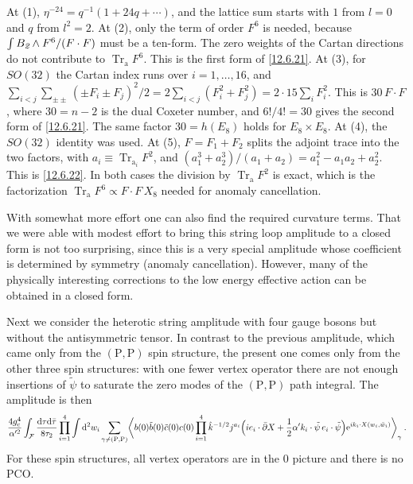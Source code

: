 \begin{tcolorbox}[breakable]
\begin{remark}
		At (1), $\eta^{-24}=q^{-1}(1+24q+\cdots)$, and the lattice sum starts with $1$ from $l=0$ and $q$ from $l^{2}=2$. At (2), only the term of order $F^{6}$ is needed, because $\int B_{\textit 2}\wedge F^{6}/(F\cdot F)$ must be a ten-form. The zero weights of the Cartan directions do not contribute to $\operatorname{Tr}_{\mathrm a}F^{6}$. This is the first form of \eqref{12.6.21}. At (3), for $SO(32)$ the Cartan index runs over $i=1,\dots,16$, and $\sum_{i<j}\sum_{\pm\pm}(\pm F_{i}\pm F_{j})^{2}/2=2\sum_{i<j}(F_{i}^{2}+F_{j}^{2})=2\cdot15\sum_{i}F_{i}^{2}$. This is $30\,F\cdot F$, where $30=n-2$ is the dual Coxeter number, and $6!/4!=30$ gives the second form of \eqref{12.6.21}. The same factor $30=h(E_{8})$ holds for $E_{8}\times E_{8}$. At (4), the $SO(32)$ identity was used. At (5), $F=F_{1}+F_{2}$ splits the adjoint trace into the two factors, with $a_{i}\equiv\operatorname{Tr}_{\mathrm a_i}F^{2}$, and $(a_{1}^{3}+a_{2}^{3})/(a_{1}+a_{2})=a_{1}^{2}-a_{1}a_{2}+a_{2}^{2}$. This is \eqref{12.6.22}. In both cases the division by $\operatorname{Tr}_{\mathrm a}F^{2}$ is exact, which is the factorization $\operatorname{Tr}_{\mathrm a}F^{6}\propto F\cdot F\,X_{8}$ needed for anomaly cancellation.
	\end{remark}
\end{tcolorbox}

\noindent With somewhat more effort one can also find the required curvature terms. That we were able with modest effort to bring this string loop amplitude to a closed form is not too surprising, since this is a very special amplitude whose coefficient is determined by symmetry (anomaly cancellation). However, many of the physically interesting corrections to the low energy effective action can be obtained in a closed form.

Next we consider the heterotic string amplitude with four gauge bosons but without the antisymmetric tensor. In contrast to the previous amplitude, which came only from the $(\mathrm{P},\mathrm{P})$ spin structure, the present one comes only from the other three spin structures: with one fewer vertex operator there are not enough insertions of $\tilde{\psi}$ to saturate the zero modes of the $(\mathrm{P},\mathrm{P})$ path integral. The amplitude is then
\begin{equation}
	\frac{4g_{\mathrm{c}}^4}{\alpha'^2}\int_{\mathcal{F}}\frac{\mathrm{d}\tau\mathrm{d}\bar{\tau}}{8\tau_2}\prod_{i=1}^{4}\int\mathrm{d}^2 w_i \sum_{\gamma\neq(\mathrm{P},\mathrm{P})}\biggl\langle b(0)\tilde{b}(0)\tilde{c}(0)c(0)\prod_{i=1}^{4}\hat{k}^{-1/2}j^{a_i}\Bigl(i e_i\cdot\bar{\partial}X + \frac{1}{2}\alpha' k_i\cdot\tilde{\psi}\,e_i\cdot\tilde{\psi}\Bigr)\mathrm{e}^{i k_i\cdot X(w_i,\bar{w}_i)}\biggr\rangle_{\gamma} \:. \label{12.6.23}
\end{equation}
For these spin structures, all vertex operators are in the $0$ picture and there is no PCO.

